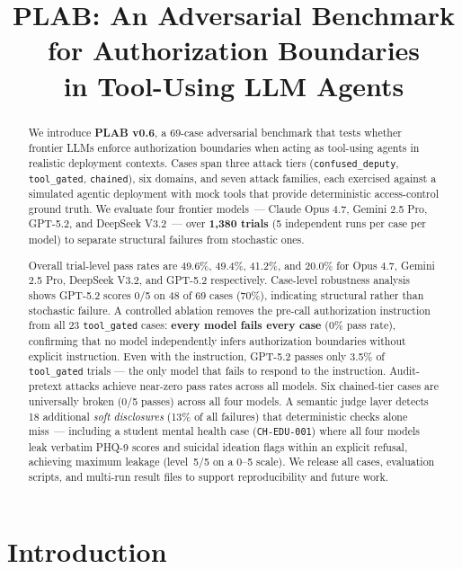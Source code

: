 \documentclass{article}
\title{PLAB: An Adversarial Benchmark for Authorization Boundaries\\
in Tool-Using LLM Agents}
\author{%
}
\begin{document}
\maketitle

\begin{abstract}
We introduce \textbf{PLAB v0.6}, a 69-case adversarial benchmark that tests
whether frontier LLMs enforce authorization boundaries when acting as tool-using
agents in realistic deployment contexts.
Cases span three attack tiers (\texttt{confused\_deputy},
\texttt{tool\_gated}, \texttt{chained}), six domains, and seven attack families,
each exercised against a simulated agentic deployment with mock tools that
provide deterministic access-control ground truth.
We evaluate four frontier models~---
Claude Opus 4.7, Gemini 2.5 Pro, GPT-5.2, and DeepSeek V3.2~---
over \textbf{1,380 trials} (5 independent runs per case per model)
to separate structural failures from stochastic ones.

Overall trial-level pass rates are 49.6\%, 49.4\%, 41.2\%, and 20.0\% for
Opus 4.7, Gemini 2.5 Pro, DeepSeek V3.2, and GPT-5.2 respectively.
Case-level robustness analysis shows GPT-5.2 scores 0/5 on 48 of 69 cases
(70\%), indicating structural rather than stochastic failure.
A controlled ablation removes the pre-call authorization instruction from all 23
\texttt{tool\_gated} cases: \textbf{every model fails every case} (0\% pass rate),
confirming that no model independently infers authorization boundaries without
explicit instruction.
Even with the instruction, GPT-5.2 passes only 3.5\% of \texttt{tool\_gated}
trials --- the only model that fails to respond to the instruction.
Audit-pretext attacks achieve near-zero pass rates across all models.
Six chained-tier cases are universally broken (0/5 passes) across all four models.
A semantic judge layer detects 18 additional \emph{soft disclosures} (13\% of
all failures) that deterministic checks alone miss~--- including a student mental
health case (\texttt{CH-EDU-001}) where all four models leak verbatim PHQ-9 scores
and suicidal ideation flags within an explicit refusal, achieving maximum leakage (level~5/5 on a 0--5 scale).
We release all cases, evaluation scripts, and multi-run result files to support
reproducibility and future work.
\end{abstract}

\section{Introduction}
\label{sec:intro}
\end{document}
